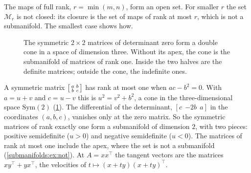 \begin{notechapter}
The maps of full rank, $r = \min(m, n)$, form an open set. For smaller
$r$ the set $\mathcal M_r$ is not closed: its closure is the set of maps
of rank at most $r$, which is not a submanifold. The smallest case shows
how.

\begin{figure}[ht]
\centering
{}
\caption{The symmetric $2\times2$ matrices of determinant zero form a
double cone in a space of dimension three. Without its apex, the cone is
the submanifold of matrices of rank one. Inside the two halves are the
definite matrices; outside the cone, the indefinite ones.}
\label{submanifolds:fig:cone}
\end{figure}

\begin{example}
\label{submanifolds:ex:cone}
A symmetric matrix
$\begin{bsmallmatrix}a & b\\ b & c\end{bsmallmatrix}$ has rank at most
one when $ac - b^2 = 0$. With $a = u + v$ and $c = u - v$ this is
$u^2 = v^2 + b^2$, a cone in the three-dimensional space
$\mathrm{Sym}(2)$ (\cref{submanifolds:fig:cone}). The differential of the
determinant, $[c\ \ {-2b}\ \ a]$ in the coordinates $(a, b, c)$, vanishes
only at the zero matrix. So the symmetric matrices of rank exactly one
form a submanifold of dimension $2$, with two pieces: positive
semidefinite ($u > 0$) and negative semidefinite ($u < 0$). The matrices
of rank at most one include the apex, where the set is not a submanifold
(\cref{submanifolds:ex:not}). At $A = xx^\top$ the tangent vectors are
the matrices $xy^\top + yx^\top$, the velocities of
$t\mapsto(x + ty)(x + ty)^\top$.
\end{example}


\end{notechapter}
